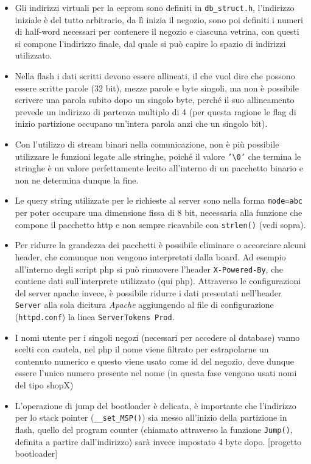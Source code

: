 \begin{itemize}
  \item Gli indirizzi virtuali per la eeprom sono definiti in \texttt{db\_struct.h}, l'indirizzo iniziale \`e del tutto arbitrario, da l\`i inizia il negozio, sono poi definiti i numeri di half-word necessari per contenere il negozio e ciascuna vetrina, con questi si compone l'indirizzo finale, dal quale si pu\`o capire lo spazio di indirizzi utilizzato.
  \item Nella flash i dati scritti devono essere allineati, il che vuol dire che possono essere scritte parole (32 bit), mezze parole e byte singoli, ma non \`e possibile scrivere una parola subito dopo un singolo byte, perch\'e il suo allineamento prevede un indirizzo di partenza multiplo di 4 (per questa ragione le flag di inizio partizione occupano un'intera parola anzi che un singolo bit).
  \item Con l'utilizzo di stream binari nella comunicazione, non \`e pi\`u possibile utilizzare le funzioni legate alle stringhe, poich\'e il valore \texttt{'\textbackslash 0'} che termina le stringhe \`e un valore perfettamente lecito all'interno di un pacchetto binario e non ne determina dunque la fine.
  \item Le query string utilizzate per le richieste al server sono nella forma \texttt{mode=abc} per poter occupare una dimensione fissa di 8 bit, necessaria alla funzione che compone il pacchetto http e non sempre ricavabile con \texttt{strlen()} (vedi sopra).
  \item Per ridurre la grandezza dei pacchetti \`e possibile eliminare o accorciare alcuni header, che comunque non vengono interpretati dalla board. Ad esempio all'interno degli script php si pu\`o rimuovere l'header \texttt{X-Powered-By}, che contiene dati sull'interprete utilizzato (qui php). Attraverso le configurazioni del server apache invece, \`e possibile ridurre i dati presentati nell'header \texttt{Server} alla sola dicitura \textit{Apache} aggiungendo al file di configurazione (\texttt{httpd.conf}) la linea \texttt{ServerTokens Prod}.
  \item I nomi utente per i singoli negozi (necessari per accedere al database) vanno scelti con cautela, nel php il nome viene filtrato per estrapolarne un contenuto numerico e questo viene usato come id del negozio, deve dunque essere l'unico numero presente nel nome (in questa fase vengono usati nomi del tipo shopX)
  \item L'operazione di jump del bootloader \`e delicata, \`e importante che l'indirizzo per lo stack pointer (\texttt{\_\_set\_MSP()}) sia messo all'inizio della partizione in flash, quello del program counter (chiamato attraverso la funzione \texttt{Jump()}, definita a partire dall'indirizzo) sar\`a invece impostato 4 byte dopo. [progetto bootloader]

\end{itemize}
